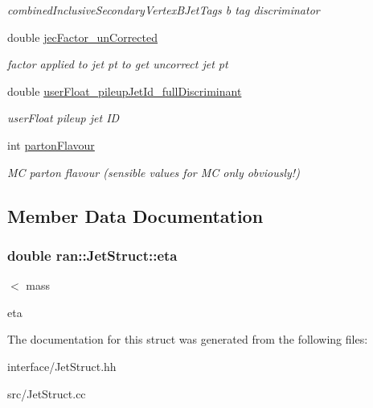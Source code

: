 \begin{DoxyCompactItemize}
\begin{DoxyCompactList}\small\item\em combined\-Inclusive\-Secondary\-Vertex\-B\-Jet\-Tags b tag discriminator \end{DoxyCompactList}\item 
\hypertarget{structran_1_1JetStruct_ae50fb1fdad429bab2f944bc355151ca6}{double \hyperlink{structran_1_1JetStruct_ae50fb1fdad429bab2f944bc355151ca6}{jec\-Factor\-\_\-un\-Corrected}}\label{structran_1_1JetStruct_ae50fb1fdad429bab2f944bc355151ca6}

\begin{DoxyCompactList}\small\item\em factor applied to jet pt to get uncorrect jet pt \end{DoxyCompactList}\item 
\hypertarget{structran_1_1JetStruct_a15787ddfba12fd8027ece6a1fec3fd0a}{double \hyperlink{structran_1_1JetStruct_a15787ddfba12fd8027ece6a1fec3fd0a}{user\-Float\-\_\-pileup\-Jet\-Id\-\_\-full\-Discriminant}}\label{structran_1_1JetStruct_a15787ddfba12fd8027ece6a1fec3fd0a}

\begin{DoxyCompactList}\small\item\em user\-Float pileup jet I\-D \end{DoxyCompactList}\item 
\hypertarget{structran_1_1JetStruct_a279791b812a272f80a8419adf8568f87}{int \hyperlink{structran_1_1JetStruct_a279791b812a272f80a8419adf8568f87}{parton\-Flavour}}\label{structran_1_1JetStruct_a279791b812a272f80a8419adf8568f87}

\begin{DoxyCompactList}\small\item\em M\-C parton flavour (sensible values for M\-C only obviously!) \end{DoxyCompactList}\end{DoxyCompactItemize}


\subsection{Member Data Documentation}
\hypertarget{structran_1_1JetStruct_a164bcdb9e674202cd0e73ee7fabafd36}{
\subsubsection[{eta}]{\setlength{\rightskip}{0pt plus 5cm}double ran\-::\-Jet\-Struct\-::eta}}\label{structran_1_1JetStruct_a164bcdb9e674202cd0e73ee7fabafd36}


$<$ mass 

eta 

The documentation for this struct was generated from the following files\-:\begin{DoxyCompactItemize}
\item 
interface/Jet\-Struct.\-hh\item 
src/Jet\-Struct.\-cc\end{DoxyCompactItemize}
